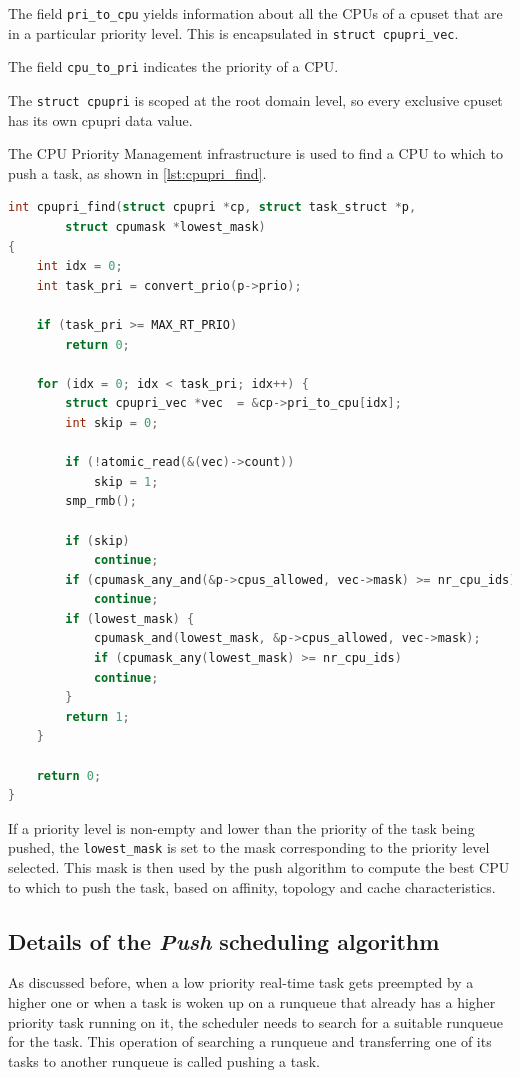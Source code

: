 The field \texttt{pri\_to\_cpu} yields information about all the CPUs
of a cpuset that are in a particular priority level. This is
encapsulated in \texttt{struct cpupri\_vec}.

The field \texttt{cpu\_to\_pri} indicates the priority of a CPU.

The \texttt{struct cpupri} is scoped at the root domain level, so
every exclusive cpuset has its own cpupri data value.

The CPU Priority Management infrastructure is used to find a CPU to
which to push a task, as shown in \ref{lst:cpupri_find}.

\begin{lstlisting}[language=C, caption={\texttt{cpupri\_find function}},
			label={lst:cpupri_find}]
int cpupri_find(struct cpupri *cp, struct task_struct *p,
		struct cpumask *lowest_mask)
{
	int idx = 0;
	int task_pri = convert_prio(p->prio);

	if (task_pri >= MAX_RT_PRIO)
		return 0;

	for (idx = 0; idx < task_pri; idx++) {
		struct cpupri_vec *vec  = &cp->pri_to_cpu[idx];
		int skip = 0;

		if (!atomic_read(&(vec)->count))
			skip = 1;
		smp_rmb();

		if (skip)
			continue;
		if (cpumask_any_and(&p->cpus_allowed, vec->mask) >= nr_cpu_ids)
			continue;
		if (lowest_mask) {
			cpumask_and(lowest_mask, &p->cpus_allowed, vec->mask);
			if (cpumask_any(lowest_mask) >= nr_cpu_ids)
			continue;
		}
		return 1;
	}

	return 0;
}
\end{lstlisting}

If a priority level is non-empty and lower than the priority of the
task being pushed, the \texttt{lowest\_mask} is set to the mask
corresponding to the priority level selected. This mask is then used
by the push algorithm to compute the best CPU to which to push the
task, based on affinity, topology and cache characteristics.

\subsection{Details of the \emph{Push} scheduling algorithm\label{sec:push_algorithm}}

As discussed before, when a low priority real-time task gets preempted
by a higher one or when a task is woken up on a runqueue that already
has a higher priority task running on it, the scheduler needs to
search for a suitable runqueue for the task. This operation of
searching a runqueue and transferring one of its tasks to another
runqueue is called pushing a task.

